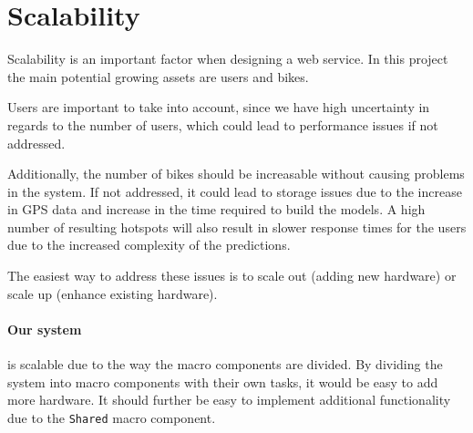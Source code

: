 \section{Scalability}
Scalability is an important factor when designing a web service. In this project the main potential growing assets are users and bikes.

Users are important to take into account, since we have high uncertainty in regards to the number of users, which could lead to performance issues if not addressed.

Additionally, the number of bikes should be increasable without causing problems in the system. If not addressed, it could lead to storage issues due to the increase in GPS data and increase in the time required to build the models.
A high number of resulting hotspots will also result in slower response times for the users due to the increased complexity of the predictions.

The easiest way to address these issues is to scale out (adding new hardware) or scale up (enhance existing hardware). \cite{michael2007scale}

\paragraph{Our system} is scalable due to the way the macro components are divided. By dividing the system into macro components with their own tasks, it would be easy to add more hardware. It should further be easy to implement additional functionality due to the \texttt{Shared} macro component.